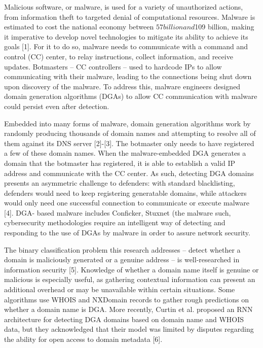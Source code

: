\documentclass{article}
\begin{document}
Malicious software, or malware, is used for a variety of unauthorized actions, from information theft to targeted denial of computational resources. Malware is estimated to cost the national economy between $57 billion and $109 billion, making it imperative to develop novel technologies to mitigate its ability to achieve its goals [1]. For it to do so, malware needs to communicate with a command and control (CC) center, to relay instructions, collect information, and receive updates. Botmasters – CC controllers – used to hardcode IPs to allow communicating with their malware, leading to the connections being shut down upon discovery of the malware. To address this, malware engineers designed domain generation algorithms (DGAs) to allow CC communication with malware could persist even after detection.

Embedded into many forms of malware, domain generation algorithms work by randomly producing thousands of domain names and attempting to resolve all of them against its DNS server [2]-[3]. The botmaster only needs to have registered a few of these domain names. When the malware-embedded DGA generates a domain that the botmaster has registered, it is able to establish a valid IP address and communicate with the CC center. As such, detecting DGA domains presents an asymmetric challenge to defenders: with standard blacklisting, defenders would need to keep registering generatable domains, while attackers would only need one successful connection to communicate or execute malware [4]. DGA- based malware includes Conficker, Stuxnet (the malware such, cybersecurity methodologies require an intelligent way of detecting and responding to the use of DGAs by malware in order to assure network security.

The binary classification problem this research addresses – detect whether a domain is maliciously generated or a genuine address – is well-researched in information security [5]. Knowledge of whether a domain name itself is genuine or malicious is especially useful, as gathering contextual information can present an additional overhead or may be unavailable within certain situations. Some algorithms use WHOIS and NXDomain records to gather rough predictions on whether a domain name is DGA. More recently, Curtin et al. proposed an RNN architecture for detecting DGA domains based on domain name and WHOIS data, but they acknowledged that their model was limited by disputes regarding the ability for open access to domain metadata [6].
\end{document}

